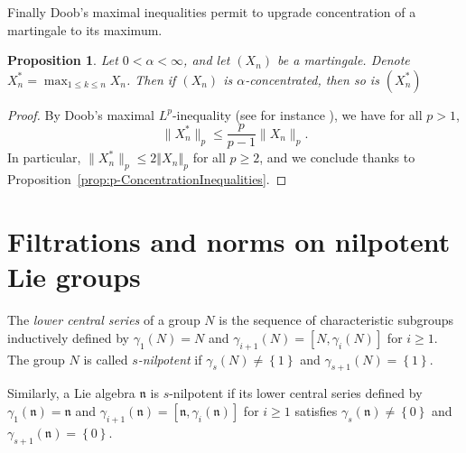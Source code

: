 \documentclass[11pt,leqno]{article}
\theoremstyle{plain}
\newtheorem{proposition}[theorem]{Proposition}
\theoremstyle{definition}
\theoremstyle{remark}
\numberwithin{equation}{section}
\begin{document}
Finally Doob's maximal inequalities permit to upgrade concentration of a martingale to its maximum.

\begin{proposition}\label{prop:MaxConcentrated} Let $0<\alpha<\infty$,
and let $(X_{n})$ be a martingale. Denote $X_{n}^{*}=\max_{1\leq k\leq n}X_{n}$.
Then if $(X_{n})$ is $\alpha$-concentrated, then so is $(X_{n}^{*})$
\end{proposition} 
\begin{proof}
By Doob's maximal $L^{p}$-inequality (see for instance \cite[Corollary II-1-6]{Revuz-Yor}),
we have for all $p>1$, 
\[
\|X_{n}^{*}\|_{p}\leq\frac{p}{p-1}\|X_{n}\|_{p}.
\]
In particular, $\|X_{n}^{*}\|_{p}\leq2\left\Vert X_{n}\right\Vert _{p}$
for all $p\geq2$, and we conclude thanks to Proposition~\ref{prop:p-ConcentrationInequalities}. 
\end{proof}


\section{Filtrations and norms on nilpotent Lie groups}\label{sec:filtration}

The \emph{lower central series} of a group $N$ is the sequence of
characteristic subgroups inductively defined by $\gamma_{1}(N)=N$
and $\gamma_{i+1}(N)=[N,\gamma_{i}(N)]$ for $i\geq1$. The group
$N$ is called \emph{$s$-nilpotent} if $\gamma_{s}(N)\neq\left\{ 1\right\} $
and $\gamma_{s+1}(N)=\left\{ 1\right\} $.

Similarly, a Lie algebra $\mathfrak{n}$ is $s$-nilpotent if its
lower central series defined by $\gamma_{1}(\mathfrak{n})=\mathfrak{n}$
and $\gamma_{i+1}(\mathfrak{n})=[\mathfrak{n},\gamma_{i}(\mathfrak{n})]$
for $i\geq1$ satisfies $\gamma_{s}(\mathfrak{n})\neq\left\{ 0\right\} $
and $\gamma_{s+1}(\mathfrak{n})=\left\{ 0\right\} $.

\end{document}
